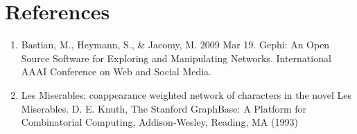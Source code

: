 \documentclass[11pt,a4paper,oneside]{article}
\begin{document}
\begin{figure}
		\qquad
	    \qquad
		\label{fig:example}%
	\end{figure}

    	
	
    \section{References}
    \begin{enumerate}
    	\item Bastian, M., Heymann, S., \& Jacomy, M. 2009 Mar 19. Gephi: An Open Source Software for Exploring and Manipulating Networks. International AAAI Conference on Web and Social Media.
    	\item Les Miserables: coappearance weighted network of characters in the novel Les Miserables. D. E. Knuth, The Stanford GraphBase: A Platform for Combinatorial Computing, Addison-Wesley, Reading, MA (1993)
    \end{enumerate}
 

    
\end{document}

